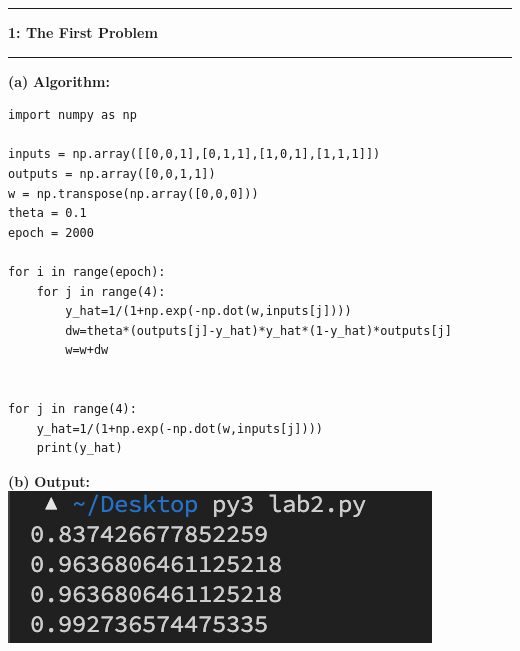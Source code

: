 \documentclass[11pt]{article}
\newcommand\question[2]{\vspace{.25in}\hrule\textbf{#1: #2}\vspace{.5em}\hrule\vspace{.10in}}
\renewcommand\part[1]{\vspace{.10in}\textbf{(#1)}}
\newcommand\algorithm{\vspace{.10in}\textbf{Algorithm: }}
\newcommand\correctness{\vspace{.10in}\textbf{Output: }}
\begin{document}
\raggedright
\newcommand\NAME{Yao Xiao}  %
\newcommand\ANDREWID{2019180015}     %
\newcommand\HWNUM{2}              %


\question{1}{The First Problem} 

\part{a} \algorithm\
\begin{lstlisting}
import numpy as np

inputs = np.array([[0,0,1],[0,1,1],[1,0,1],[1,1,1]])
outputs = np.array([0,0,1,1])
w = np.transpose(np.array([0,0,0]))
theta = 0.1
epoch = 2000

for i in range(epoch):
    for j in range(4):
        y_hat=1/(1+np.exp(-np.dot(w,inputs[j])))
        dw=theta*(outputs[j]-y_hat)*y_hat*(1-y_hat)*outputs[j]
        w=w+dw


for j in range(4):
    y_hat=1/(1+np.exp(-np.dot(w,inputs[j])))
    print(y_hat)
\end{lstlisting}

\part{b} \correctness\\
\includegraphics[scale=1]{ot1.png}
\end{document}
